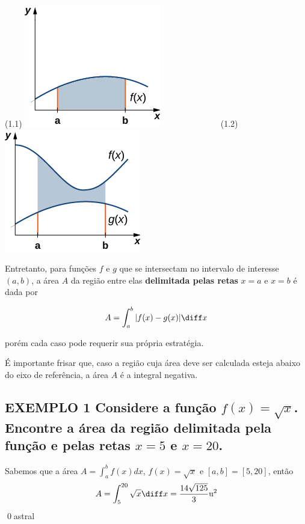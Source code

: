 \documentclass[a4paper, 12pt]{extreport}
\begin{document}
    \begin{center}
      {
        (1.1)
        \includegraphics{fx}
      }
      \ \ \ \ \ \ \ \ \ \ \ \ \
      {
        (1.2)
        \includegraphics{two-func}
      }
    \end{center}

    Entretanto, para funções $ f $ e $ g $ que se intersectam no intervalo de interesse $ (a, b) $, a área $A$ da região entre elas \textbf{delimitada pelas
    retas} $x=a$ e $x=b$ é dada por

    \begin{equation} \label{eq:3}
      A = \int_a^b{|f(x) - g(x)|}\diff x
    \end{equation}

    \flushleft porém cada caso pode requerir sua própria estratégia.

    {\justifying É importante frisar que, caso a região cuja área deve ser calculada esteja abaixo do eixo de referência,
    a área $A$ é a integral negativa.}

    \subsection*{\small {\color{astral}EXEMPLO 1} \textmd{
      Considere a função $f(x) = \sqrt{x}$. Encontre a área da região delimitada pela função e pelas retas $x=5$ e $x=20$.
    }}
      Sabemos que a área $A=\int_a^b{f(x)dx}$, $f(x)=\sqrt{x}$ e $[a, b]=[5, 20]$, então
      $$ A = \int_5^{20}{\sqrt{x}\diff x} = \frac{14\sqrt{125}}{3}\mathrm{u^2} $$
      \qed{astral}
\end{document}
